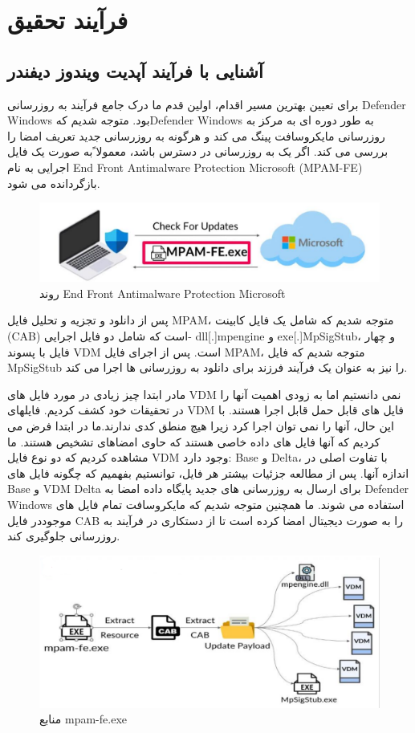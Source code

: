 \documentclass{ISCISC2020}
\begin{document}
\section{فرآیند تحقیق}
\subsection{آشنایی با فرآیند آپدیت ویندوز دیفندر}
برای تعیین بهترین مسیر اقدام، اولین قدم ما درک جامع فرآیند به روزرسانی Defender Windows بود. متوجه شدیم کهDefender Windows به طور دوره ای به مرکز به روزرسانی مایکروسافت پینگ می کند و هرگونه به روزرسانی جدید 
تعریف امضا را بررسی می کند. اگر یک به روزرسانی در دسترس باشد، معمولا ًبه صورت یک فایل اجرایی به نام   End Front Antimalware Protection Microsoft (MPAM-FE) بازگردانده می شود.

\begin{figure}[h]
	\includegraphics[width=\linewidth]{Images/1.png}
 	\caption{روند End Front Antimalware Protection Microsoft}

\end{figure}

پس از دانلود و تجزیه و تحلیل فایل MPAM، متوجه شدیم که شامل یک فایل کابینت (CAB) است که شامل دو فایل 
اجرایی- dll[.]mpengine و exe[.]MpSigStub، و چهار فایل با پسوند VDM است. پس از اجرای فایل MPAM، 
متوجه شدیم که فایل MpSigStub را نیز به عنوان یک فرآیند فرزند برای دانلود به روزرسانی ها اجرا می کند. 


مادر ابتدا چیز زیادی در مورد فایل های VDM نمی دانستیم اما به زودی اهمیت آنها را در تحقیقات خود کشف کردیم. 
فایلهای VDM فایل های قابل حمل قابل اجرا هستند. با این حال، آنها را نمی توان اجرا کرد زیرا هیچ منطق کدی 
ندارند.ما در ابتدا فرض می کردیم که آنها فایل های داده خاصی هستند که حاوی امضاهای تشخیص هستند. ما 
مشاهده کردیم که دو نوع فایل VDM وجود دارد: Base و Delta، با تفاوت اصلی در اندازه آنها. پس از مطالعه جزئیات 
بیشتر هر فایل، توانستیم بفهمیم که چگونه فایل های Base و VDM Delta برای ارسال به روزرسانی های جدید پایگاه 
داده امضا به Defender Windows استفاده می شوند. ما همچنین متوجه شدیم که مایکروسافت تمام فایل های 
موجوددر فایل CAB را به صورت دیجیتال امضا کرده است تا از دستکاری در فرآیند به روزرسانی جلوگیری کند.

\begin{figure}[h]
	\includegraphics[width=\linewidth]{Images/2.png}
	\caption{منابع mpam-fe.exe}
\end{figure}
\end{document}
